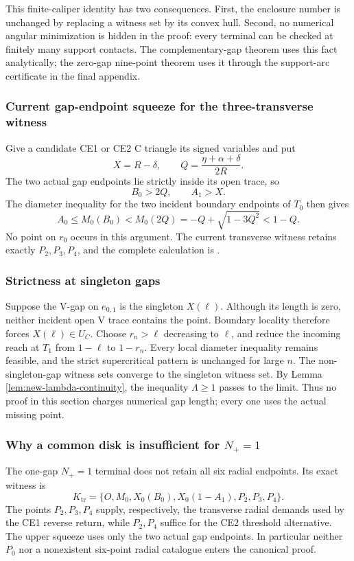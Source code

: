 This finite-caliper identity has two consequences.  First, the enclosure
number is unchanged by replacing a witness set by its convex hull.  Second,
no numerical angular minimization is hidden in the proof: every terminal can
be checked at finitely many support contacts.  The complementary-gap theorem
uses this fact analytically; the zero-gap nine-point theorem uses it through
the support-arc certificate in the final appendix.

\subsubsection{Current gap-endpoint squeeze for the three-transverse witness}

Give a candidate CE1 or CE2 C triangle its signed variables and put
\[
 X=R-\delta,
 \qquad Q=\frac{\eta+\alpha+\delta}{2R}.
\]
The two actual gap endpoints lie strictly inside its open trace, so
\[
 B_0>2Q,
 \qquad A_1>X.
\]
The diameter inequality for the two incident boundary endpoints of $T_0$
then gives
\[
 A_0\le M_0(B_0)<M_0(2Q)
 =-Q+\sqrt{1-3Q^2}<1-Q.
\]
No point on $r_0$ occurs in this argument.  The current transverse witness
retains exactly $P_2,P_3,P_4$, and the complete calculation is
.

\subsubsection{Strictness at singleton gaps}

Suppose the V-gap on $e_{0,1}$ is the singleton $X(\ell)$.  Although its
length is zero, neither incident open V trace contains the point.  Boundary
locality therefore forces $X(\ell)\in U_C$.  Choose
$r_n>\ell$ decreasing to $\ell$, and reduce the incoming reach at $T_1$ from
$1-\ell$ to $1-r_n$.  Every local diameter inequality remains feasible, and
the strict supercritical pattern is unchanged for large $n$.  The non-singleton-gap
witness sets converge to the singleton witness set.  By Lemma
\ref{lem:new-lambda-continuity}, the inequality $\Lambda\ge1$ passes to the
limit.  Thus no proof in this section charges numerical gap length; every one
uses the actual missing point.

\subsubsection{Why a common disk is insufficient for $N_+=1$}

The one-gap $N_+=1$ terminal does not retain all six radial endpoints.  Its
exact witness is
\[
 K_{\mathrm{tr}}=
 \{O,M_0,X_0(B_0),X_0(1-A_1),P_2,P_3,P_4\}.
\]
The points $P_2,P_3,P_4$ supply, respectively, the transverse radial demands
used by the CE1 reverse return, while $P_2,P_4$ suffice for the CE2 threshold
alternative.  The upper squeeze uses only the two actual gap endpoints.  In
particular neither $P_0$ nor a nonexistent six-point radial catalogue enters
the canonical proof.
